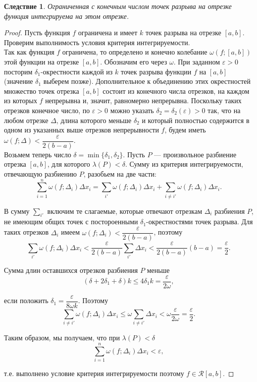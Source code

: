 \documentclass[12pt]{article}
\numberwithin{equation}{section}
\newtheorem{remark}{Следствие}[section]
\begin{document}
\begin{remark} Ограниченная с конечным числом точек разрыва на отрезке функция интегрируема на этом отрезке.
\end{remark}
\begin{proof}
Пусть функция $f$ ограничена и имеет $k$ точек разрыва на отрезке $[a,b]$. Проверим выполнимость условия критерия интегрируемости.\\

Так как функция $f$ ограничена, то определено и конечно колебание $\omega(f; [a,b])$ этой функции на отрезке $[a,b]$. Обозначим его через $\omega$. При заданном $\varepsilon > 0$ посторим $\delta_1$-окрестности каждой из $k$ точек разрыва функции $f$ на $[a,b]$ (значение $\delta_1$ выберем позже). Дополнительное к объединению этих окрестностей множество точек отрезка $[a,b]$ состоит из конечного числа отрезков, на каждом из которых $f$ непрерывна и, значит, равномерно непрерывна. Поскольку таких отрезков конечное число, по $\varepsilon > 0$ можно указать $\delta_2 = \delta_2(\varepsilon) > 0$ так, что на любом отрезке $\Delta$, длина которого меньше $\delta_2$  и который полностью содержится в одном из указанных выше отрезков непрерывности $f$, будем иметь $\omega(f; \Delta) < \dfrac{\varepsilon}{2(b-a)}$.\\

Возьмем теперь число $\delta = \min\{\delta_1, \delta_2\}$. Пусть $P$ --- произвольное разбиение отрезка $[a,b]$, для которого $\lambda(P) < \delta$. Сумму из критерия интегрируемости, отвечающую разбиению $P$, разобьем на две части:
\[ \sum_{i = 1}^n \omega(f; \Delta_i) \Delta x_i = \sum_{i'} \omega(f; \Delta_i) \Delta x_i + \sum_{i \neq i'} \omega(f; \Delta_i) \Delta x_i.\]

В сумму $\sum\limits_{i'}$ включим те слагаемые, которые отвечают отрезкам $\Delta_i$ разбиения $P$, не имеющим общих точек с постороенными $\delta_1$-окрестностями точек разрыва. Для таких отрезков $\Delta_i$ имеем $\omega(f; \Delta_i) < \dfrac{\varepsilon}{2(b-a)}$, поэтому
\[ \sum_{i'} \omega(f; \Delta_i) \Delta x_i < \frac{\varepsilon}{2(b-a)} \sum_{i'} \Delta x_i < \frac{\varepsilon}{2(b-a)} (b-a) = \frac{\varepsilon}{2}.\]

Сумма длин оставшихся отрезков разбиения $P$ меньше
\[ (\delta + 2 \delta_1 + \delta)k \leqslant 4 \delta_1 k = \frac{\varepsilon}{2\omega},\]

если положить $\delta_1 = \dfrac{\varepsilon}{8\omega k}$. Поэтому
\[ \sum_{i \neq i'} \omega(f; \Delta_i) \Delta x_i \leqslant \omega \sum_{i \neq i'} \Delta x_i < \omega \frac{\varepsilon}{2\omega} = \frac{\varepsilon}{2}.\]

Таким образом, мы получаем, что при $\lambda(P) < \delta$
\[ \sum_{i = 1}^n \omega(f; \Delta_i) \Delta x_i < \varepsilon, \]

т.е. выполнено условие критерия интегрируемости поэтому $f \in \mathcal{R}[a,b]$.
\end{proof}
\end{document}
